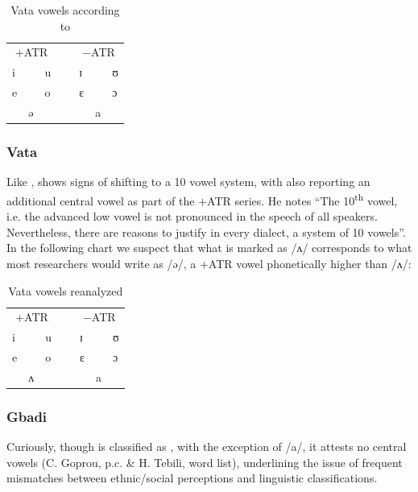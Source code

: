 \documentclass[output=paper,newtxmath,modfonts,nonflat,draft]{langsci/langscibook}
\begin{document}
\begin{table}
\caption{Vata vowels according to \citet{Kaye1980}}	
\label{tab:zogbo:14}
\begin{tabular}{lllllll}
\multicolumn{3}{c}{+ATR} && \multicolumn{3}{c}{−ATR}\\ 
i  &&  u  &~&  ɪ  &&  ʊ\\

e  &&  o  &&  ɛ  &&  ɔ\\

& ə   &&&&     a \\
	\end{tabular}
\end{table}

\subsubsection{Vata}
Like ,  shows signs of shifting to a 10 vowel system, with \citet[70]{Kaye1980} also reporting an additional central vowel as part of the +ATR series. He notes “The 10\textsuperscript{th} vowel, i.e. the advanced low vowel is not pronounced in the speech of all  speakers.  Nevertheless, there are reasons to justify in every  dialect, a system of 10 vowels”. In the following chart we suspect that what is marked as /ʌ/ corresponds to what most  researchers would write as /ə/, a  +ATR vowel phonetically higher than /ʌ/:


\begin{table}
\caption{Vata vowels reanalyzed}	
\label{tab:zogbo:15}
\begin{tabular}{lllllll}
\multicolumn{3}{c}{+ATR} && \multicolumn{3}{c}{−ATR}\\ 
i  &&  u  &~&  ɪ  &&  ʊ\\

e  &&  o  &&  ɛ  &&  ɔ\\

& ʌ   &&&&     a \\
	\end{tabular}
\end{table}

\subsubsection{Gbadi} Curiously, though  is classified as , with the exception of /a/, it attests no central vowels (C. Goprou, p.c. \& H. Tebili, word list), underlining the issue of frequent mismatches between ethnic/social perceptions and linguistic classifications. 
\end{document}
